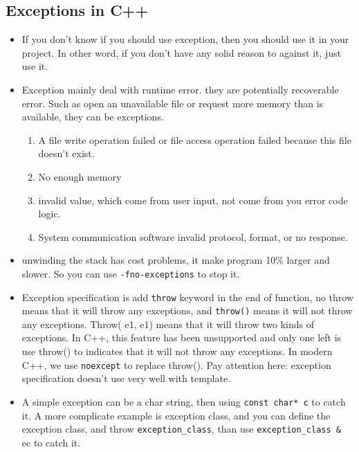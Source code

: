 \documentclass[a4paper,11pt,twoside]{book}
\begin{document}
\subsection{Exceptions in C++}
\begin{itemize}
	\item If you don't know if you should use exception, then you should use it in your project. In other word, if you don't have any solid reason to against it, just use it.
	
	\item Exception mainly deal with runtime error. they are potentially recoverable error.  Such as open an unavailable file or request more memory than is available, they can be exceptions.	
	\begin{enumerate}
		\item A file write operation failed or file access operation failed because this file doesn't exist.
		
		\item No enough memory
		
		\item invalid value, which come from user input, not come from you error code logic.
		
		\item System communication software invalid protocol, format, or no response.
	\end{enumerate}
	
	\item unwinding the stack has cost problems, it make program 10\% larger and slower. So you can use \texttt{-fno-exceptions} to stop it.
	
	\item Exception specification is add \texttt{throw} keyword in the end of function, no throw means that it will throw any exceptions, and \texttt{throw()} means it will not throw any exceptions. Throw( e1, e1) means that it will throw two kinds of exceptions. In C++, this feature has been unsupported and only one left is use throw() to indicates that it will not throw any exceptions. In modern C++, we use \texttt{noexcept} to replace throw(). Pay attention here: exception specification doesn't use very well with template. 
	
	\item A simple exception can be a char string, then using \texttt{const char* c} to catch it. A more complicate example is exception class, and you can define the exception class, and throw \texttt{exception\_class}, than use \texttt{exception\_class \& }ec to catch it.  
	

\end{itemize}
\end{document}

